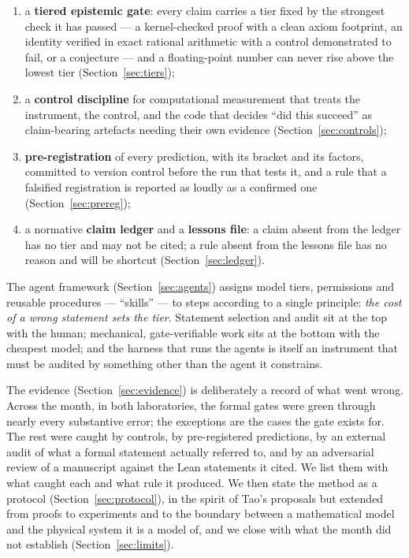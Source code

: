 \documentclass[11pt]{article}
\begin{document}
\begin{enumerate}[leftmargin=*,itemsep=1pt]
\item a \textbf{tiered epistemic gate}: every claim carries a tier fixed by the strongest check
  it has passed --- a kernel-checked proof with a clean axiom footprint, an identity verified in
  exact rational arithmetic with a control demonstrated to fail, or a conjecture --- and a
  floating-point number can never rise above the lowest tier (Section~\ref{sec:tiers});
\item a \textbf{control discipline} for computational measurement that treats the instrument,
  the control, and the code that decides ``did this succeed'' as claim-bearing artefacts
  needing their own evidence (Section~\ref{sec:controls});
\item \textbf{pre-registration} of every prediction, with its bracket and its factors, committed
  to version control before the run that tests it, and a rule that a falsified registration is
  reported as loudly as a confirmed one (Section~\ref{sec:prereg});
\item a normative \textbf{claim ledger} and a \textbf{lessons file}: a claim absent from the
  ledger has no tier and may not be cited; a rule absent from the lessons file has no reason and
  will be shortcut (Section~\ref{sec:ledger}).
\end{enumerate}

The agent framework (Section~\ref{sec:agents}) assigns model tiers, permissions and reusable
procedures --- ``skills'' --- to steps according to a single principle: \emph{the cost of a
wrong statement sets the tier}. Statement selection and audit sit at the top with the human;
mechanical, gate-verifiable work sits at the bottom with the cheapest model; and the harness
that runs the agents is itself an instrument that must be audited by something other than the
agent it constrains.

The evidence (Section~\ref{sec:evidence}) is deliberately a record of what went wrong. Across
the month, in both laboratories, the formal gates were green through nearly every substantive
error; the exceptions are the cases the gate exists for. The rest were caught by controls, by pre-registered predictions, by an external audit of what
a formal statement actually referred to, and by an adversarial review of a manuscript against
the Lean statements it cited. We list them with what caught each and what rule it produced. We
then state the method as a protocol (Section~\ref{sec:protocol}), in the spirit of Tao's
proposals but extended from proofs to experiments and to the boundary between a mathematical
model and the physical system it is a model of, and we close with what the month did not
establish (Section~\ref{sec:limits}).
\end{document}
